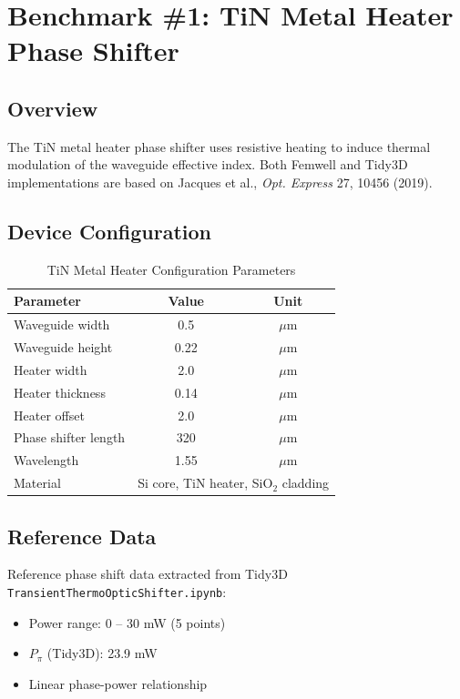 \documentclass[11pt,a4paper]{article}
\begin{document}
\section{Benchmark \#1: TiN Metal Heater Phase Shifter}

\subsection{Overview}
The TiN metal heater phase shifter uses resistive heating to induce thermal modulation of the waveguide effective index. Both Femwell and Tidy3D implementations are based on Jacques et al., \textit{Opt. Express} 27, 10456 (2019).

\subsection{Device Configuration}
\begin{table}[H]
\centering
\caption{TiN Metal Heater Configuration Parameters}
\label{tab:metal_heater_params}
\begin{tabular}{lcc}
\toprule
\textbf{Parameter} & \textbf{Value} & \textbf{Unit} \\
\midrule
Waveguide width & 0.5 & $\mu$m \\
Waveguide height & 0.22 & $\mu$m \\
Heater width & 2.0 & $\mu$m \\
Heater thickness & 0.14 & $\mu$m \\
Heater offset & 2.0 & $\mu$m \\
Phase shifter length & 320 & $\mu$m \\
Wavelength & 1.55 & $\mu$m \\
Material & \multicolumn{2}{c}{Si core, TiN heater, SiO$_2$ cladding} \\
\bottomrule
\end{tabular}
\end{table}

\subsection{Reference Data}
Reference phase shift data extracted from Tidy3D \texttt{TransientThermoOpticShifter.ipynb}:
\begin{itemize}
    \item Power range: 0 -- 30 mW (5 points)
    \item $P_\pi$ (Tidy3D): 23.9 mW
    \item Linear phase-power relationship
\end{itemize}
\end{document}
